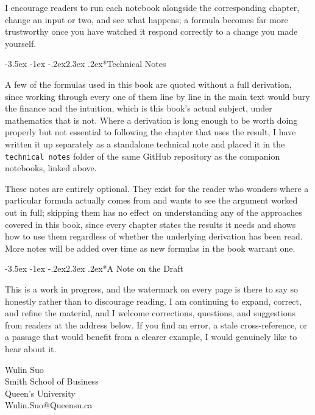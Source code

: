 \documentclass[openany]{book}
\makeatletter
\renewcommand\section{\@startsection {section}{1}{\z@}%
  {-3.5ex \@plus -1ex \@minus -.2ex}{2.3ex \@plus.2ex}{\normalfont\large\bfseries}}
\makeatother
\begin{document}
I encourage readers to run each notebook alongside the corresponding chapter, change an input or two, and see what happens; a formula becomes far more trustworthy once you have watched it respond correctly to a change you made yourself.

\section*{Technical Notes}

A few of the formulas used in this book are quoted without a full derivation, since working through every one of them line by line in the main text would bury the finance and the intuition, which is this book's actual subject, under mathematics that is not. Where a derivation is long enough to be worth doing properly but not essential to following the chapter that uses the result, I have written it up separately as a standalone technical note and placed it in the \texttt{technical notes} folder of the same GitHub repository as the companion notebooks, linked above.

These notes are entirely optional. They exist for the reader who wonders where a particular formula actually comes from and wants to see the argument worked out in full; skipping them has no effect on understanding any of the approaches covered in this book, since every chapter states the results it needs and shows how to use them regardless of whether the underlying derivation has been read. More notes will be added over time as new formulas in the book warrant one.

\section*{A Note on the Draft}

This is a work in progress, and the watermark on every page is there to say so honestly rather than to discourage reading. 
I am continuing to expand, correct, and refine the material, and I welcome corrections, questions, and suggestions from 
readers at the address below. If you find an error, a stale cross-reference, or a passage that would benefit from a clearer example, 
I would genuinely like to hear about it.

\vspace{1em}
\noindent Wulin Suo\\
Smith School of Business \\
Queen's University\\
Wulin.Suo@Queensu.ca
\end{document}
